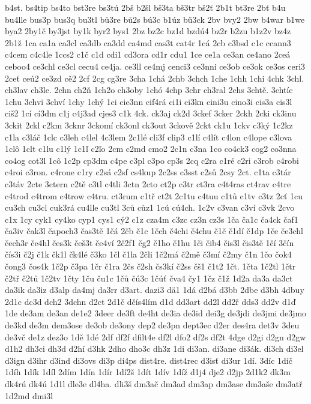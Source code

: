 {b4st.
bs4tip
bs4to
bst3re
bs3tú
2bš
b2šl
bš3ta
bš3tr
bš2ť
2b1t
bt3re
2bť
b4u
bu4lle
bus3p
bus3q
bu3tl
bů3re
bů2s
bú3c
b1úz
bü3ck
2bv
bvy2
2bw
b4war
b1we
bya2
2by1č
by3jst
by1k
byr2
bys1
2bz
bz2c
bz1d
bzdú4
bz2r
b2zu
b1z2v
bz4z
2b1ž
1ca
ca1a
ca3cl
ca3db
ca3dd
ca4md
cas3t
cat4r
1cá
2cb
c3bsd
c1c
ccann3
c4cem
c4c4le
1ccs2
c1č
c1d
cdi1
cd3ora
cd1r
cdu1
1ce
ce1a
ce3an
ce4ano
2ceá
ceboo4
ce3chl
ce3cl
cecu4
ce4ja.
ce3ll
ce4mj
cenci3
ce3nni
ce3ob
ce3ok
ce3os
ceri3
2ceť
ceú2
ce3zd
cě2
2cf
2cg
cg3re
3cha
1chá
2chb
3chch
1che
1chh
1chi
4chk
3chl.
ch3lav
ch3le.
2chn
ch2ň
1ch2o
ch3oby
1chó
4chp
3chr
ch3ral
2chs
3chtě.
3chtíc
1chu
3chvi
3chví
1chy
1chý
1ci
cie3nn
cif4rá
ci1i
ci3kn
cini3u
cino3i
cis3a
cis3l
ciš2
1cí
cí3dm
c1j
c4j3ad
cjes3
c1k
4ck.
ck3aj
ck2d
3ckef
3cker
2ckh
2cki
ck3inu
3ckit
2ckl
c2km
3cknr
3ckomí
ck3onl
ck3out
3ckově
2ckt
ck1u
1ckv
c3ký
1c2kz
c1la
c3láč
1clc
c3leh
c4lel
4c3lem
2c1lé
cli3f
clip3
c1lí
c4lít
c4lon
c4lope
c3lova
1clô
1clt
c1lu
c1lý
1c1ľ
c2ľo
2cm
c2md
cmo2
2c1n
c3na
1co
co4ck3
cog2
co3nna
co4og
cot3l
1cô
1c2p
cp3dm
c4pe
c3pl
c3po
cp3s
2cq
c2ra
c1ré
c2ri
c3rob
c4robi
c4roi
c3ron.
c4rone
c1ry
c2sá
c2sf
cs4kup
2c2ss
c3sst
c2sů
2csy
2ct.
c1ta
c3tár
c3táv
2cte
3ctern
c2tě
c3tl
c4tli
3ctn
2cto
ct2p
c3tr
ct3ra
c4t4ras
ct4rav
c4tre
c4trod
c4trom
c4trow
c4tru.
ct3rum
c1tř
ct2t
2c1tu
c4tuu
c1tů
c1tv
c3tz
2cť
1cu
cu3ch
cu3cl
cuk3rá
cu4lle
cu3tl
3ců
cůz1
1cú
cú4ch.
1c2v
c3van
c3ví
c3vk
2cvo
c1x
1cy
cyk1
cy4ko
cyp1
cys1
cý2
c1z
cza4m
c3zc
cz3n
cz3s
1ča
ča1c
ča4ck
čaf1
ča3iv
čak3l
čapoch3
čas3tě
1čá
2čb
č1c
1čch
č4chi
č4chu
č1č
č1dí
č1dp
1če
če3chl
čech3r
če4hl
čes3k
češ3t
če4ví
2č2f1
čg2
č1ho
č1hu
1či
čib4
čis3l
čis3tě
1čí
3čín
čís3i
č2j
č1k
čk1l
čk4lé
č3ko
1čl
č1la
2čli
1č2má
č2mě
č3mí
č2my
č1n
1čo
čok4
čong3
čos4k
1č2p
č3pa
1čr
č1ra
2čs
č2sh
čs3kí
č2ss
čš1
č1t2
1čt.
1čta
1č2tl
1čtr
č2tř
č2tů
1č2tv
1čty
1ču
ču1c
1čů
čú3c
1čúť
čva4
čy1
1čz
č1ž
1d2a
da3a
da3ct
da3ik
da3iz
d3alp
da4mj
da3rr
d3art.
dazi3
dä1
1dá
d2bá
d3bb
2dbe
d3bh
4dbuy
2d1c
dc3d
dch2
3dchn
d2ct
2d1č
dčís4lím
d1d
dd3art
dd2l
dd2ř
dds3
dd2v
d1ď
1de
de3am
de3an
de1e2
3deer
de3ft
de4ht
de3ia
de3id
dei3g
de3jdi
de3jmi
de3jmo
de3kd
de3m
dem3ose
de3ob
de3ony
dep2
de3pn
dept3ec
d2er
des4ra
det3v
3deu
de3vč
de1z
dez3o
1dě
1dé
2df
df2f
dfilt4e
df2l
dfo2
df2s
df2t
4dge
d2gi
d2gn
d2gw
d1h2
dh3ci
dh3d
d2hí
d3hk
2dho
dho3c
dh3z
1di
di3an.
di3ane
di3ák.
di3ch
di3el
d3ign
d3ihr
d3ind
di3ovs
di3p
di4ps
dist4re.
dist4rec
d3isť
di3ur
1dí.
3díc
1díč
1díh
1dík
1díl
2dím
1dín
1dír
1dí2š
1dít
1dív
1díž
d1j4
dje2
d2jp
2d1k2
dk3m
dk4rú
dk4ú
1d1l
dle3e
dl4ha.
dli3š
dm3ač
dm3ad
dm3ap
dm3ase
dm3aše
dm3atř
1d2md
dmi3l
}
